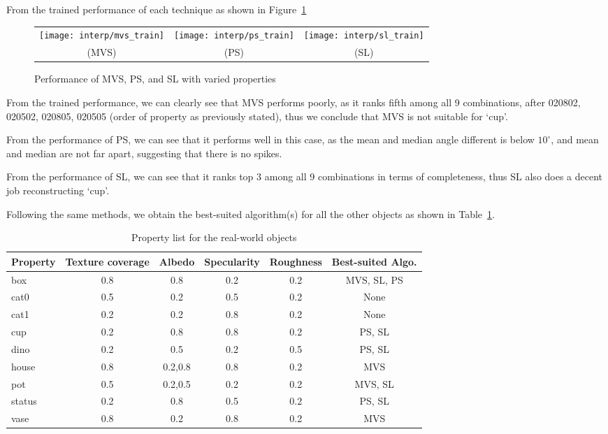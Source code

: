 From the trained performance of each technique as shown in Figure~\ref{fig:train_cup}
\begin{figure}[h!]
\begin{tabular}{ccc}
\texttt{[image: interp/mvs\_train]}&
\texttt{[image: interp/ps\_train]}&
\texttt{[image: interp/sl\_train]}\\
(MVS) & (PS) & (SL)\\
\end{tabular}
\caption{Performance of MVS, PS, and SL with varied properties}
\label{fig:train_cup}
\end{figure}

From the trained performance, we can clearly see that MVS performs poorly, as it ranks fifth among all 9 combinations, after 020802, 020502, 020805, 020505 (order of property as previously stated), thus we conclude that MVS is not suitable for	`cup'.

From the performance of PS, we can see that it performs well in this case, as the mean and median angle different is below $10^\circ$, and mean and median are not far apart, suggesting that there is no spikes.

From the performance of SL, we can see that it ranks top 3 among all 9 combinations in terms of completeness, thus SL also does a decent job reconstructing `cup'.

Following the same methods, we obtain the best-suited algorithm(s) for all the other objects as shown in Table~\ref{tab:prop_list_real_world_obj}.

\begin{table}[h]
  \centering
  \begin{tabular}{l*{5}{c}}
  \hline
  \textbf{Property} & Texture coverage & Albedo & Specularity & Roughness & Best-suited Algo.\\
  \hline
  box & 0.8 & 0.8 & 0.2 & 0.2 & MVS, SL, PS\\
  cat0 & 0.5 & 0.2 & 0.5 & 0.2 & None\\
  cat1 & 0.2 & 0.2 & 0.8 & 0.2 & None\\
  cup & 0.2 & 0.8 & 0.8 & 0.2 & PS, SL\\
  dino & 0.2 & 0.5 & 0.2 & 0.5 & PS, SL\\
  house & 0.8 & 0.2,0.8 & 0.8 & 0.2 & MVS\\
  pot & 0.5 & 0.2,0.5 & 0.2 & 0.2 & MVS, SL\\
  status & 0.2 & 0.8 & 0.5 & 0.2 & PS, SL\\
  vase & 0.8 & 0.2 & 0.8 & 0.2 & MVS\\
  \hline
  \end{tabular}
  \label{tab:prop_list_real_world_obj}
  \caption{Property list for the real-world objects}
\end{table}

